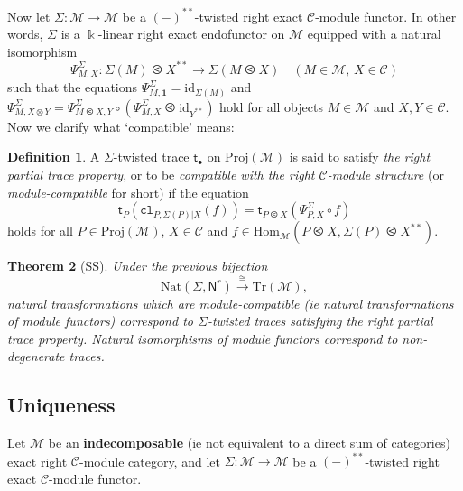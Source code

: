 \documentclass[11pt]{article}
\newcommand{\C}{\mathcal{C}}
\newtheorem{theorem}{Theorem}[section]
\theoremstyle{definition}
\newtheorem{definition}[theorem]{Definition}
\begin{document}
Now let $\Sigma: \mathcal{M} \to \mathcal{M}$ be a $ (-)^{**}$-twisted right exact $\C$-module functor. In other words, $\Sigma$ is a $\Bbbk$-linear right exact endofunctor on $\mathcal{M}$ equipped with a natural
isomorphism
\[
\Psi^{\Sigma}_{M,X} : \Sigma(M) \olessthan X^{**} \to \Sigma(M \olessthan X) \quad (M \in \mathcal{M},\, X \in \mathcal{C})
\]
such that the equations $\Psi^{\Sigma}_{M,\mathbf{1}} = \mathrm{id}_{\Sigma(M)}$ and $\Psi^{\Sigma}_{M, X \otimes Y} = \Psi^{\Sigma}_{M \olessthan X, Y} \circ (\Psi^{\Sigma}_{M,X} \olessthan \mathrm{id}_{Y^{**}})$
hold for all objects $M \in \mathcal{M}$ and $X, Y \in \mathcal{C}$. Now we clarify what `compatible'
means:

\begin{definition}
A $\Sigma$-twisted trace $\mathsf{t}_\bullet$ on $\mathrm{Proj}(\mathcal{M})$ is said to satisfy \textit{the right partial trace property}, or to be \emph{compatible with
the right $\mathcal{C}$-module structure} (or \emph{module-compatible} for short) if the equation
\begin{equation}
\mathsf{t}_P(\mathtt{cl}_{P,\Sigma(P)|X}(f)) = \mathsf{t}_{P \olessthan X}(\Psi^{\Sigma}_{P,X} \circ f) \tag{5.3}
\end{equation}
holds for all $P \in \mathrm{Proj}(\mathcal{M})$, $X \in \mathcal{C}$ and $f \in \mathrm{Hom}_{\mathcal{M}}(P \olessthan X, \Sigma(P) \olessthan X^{**})$.
\end{definition} 




\begin{theorem}[SS]
Under the previous bijection
$$ \mathrm{Nat}(\Sigma, \mathsf{N}^r) \overset{\cong}{\to}  \mathrm{Tr}(\mathcal{M}), $$ natural transformations which are module-compatible (ie natural transformations of module functors) correspond to $\Sigma$-twisted traces satisfying the right partial trace property. Natural isomorphisms of module functors correspond to non-degenerate traces.
\end{theorem}


\subsection{Uniqueness}


Let $\mathcal{M}$ be an \textbf{indecomposable} (ie not equivalent to a direct sum of categories)  exact right $\C$-module category, and let $\Sigma: \mathcal{M} \to \mathcal{M}$ be a $ (-)^{**}$-twisted right exact $\C$-module functor.
\end{document}
